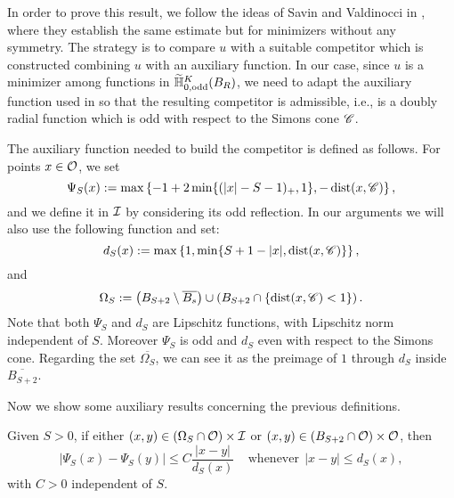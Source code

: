 In order to prove this result, we follow the ideas of Savin and Valdinocci in \cite{SavinValdinoci-EnergyEstimate}, where they establish the same estimate but for minimizers without any symmetry. The strategy is to compare $u$ with a suitable competitor which is constructed combining $u$ with an auxiliary function. In our case, since $u$ is a minimizer among functions in $\widetilde{\mathbb{H}}^K_{0, \mathrm{odd}}(B_R)$, we need to adapt the auxiliary function used in \cite{SavinValdinoci-EnergyEstimate} so that the resulting competitor is admissible, i.e., is a doubly radial function which is odd with  respect to the Simons cone $\mathscr{C}$.

The auxiliary function needed to build the competitor is defined as follows. For points $x\in \mathcal{O}$, we set
$$ \Psi_S(x) := \max\left\{-1+2\min\{(|x|-S-1)_+,1\},-\operatorname{dist}(x,\mathscr{C}) \right\},  $$
and we define it in $\mathcal{I}$ by considering its odd reflection. In our arguments we will also use the following function and set:
$$ d_S(x) := \max\left\{1,\min\{S+1-|x|,\operatorname{dist}(x,\mathscr{C})\} \right\},  $$
and
\begin{equation}
\label{Eq:DefOmegaS}
\Omega_S := \left( B_{S+2}\setminus \overline{B_s} \right) \cup \left( B_{S+2} \cap \{\operatorname{dist}(x,\mathscr{C})< 1\}\right).
\end{equation} 
Note that both $\Psi_S$ and $d_S$ are Lipschitz functions, with Lipschitz norm independent of
$S$. Moreover $\Psi_S$ is odd and $d_S$ even with respect to the Simons cone. Regarding the set $\overline{\Omega_S}$, we can see it as the preimage of $1$ through $d_S$ inside $\overline{B_{S+2}}$.

Now we show some auxiliary results concerning the previous definitions.

\begin{lemma}
\label{Lemma: AdaptedLipschitzConditionWith_dFunction}
Given $S>0$, if either $(x,y) \in \left(\Omega_S\cap \mathcal{O}\right) \times \mathcal{I}$ or $(x,y)\in \left(B_{S+2}\cap \mathcal{O}\right) \times \mathcal{O}$, then
$$ |\Psi_S(x) - \Psi_S(y)| \leq C \frac{|x-y|}{d_S(x)} \ \ \ \ \ \textrm{whenever} \ \ |x-y|\leq d_S(x), $$
with $C>0$ independent of $S$.
\end{lemma}

